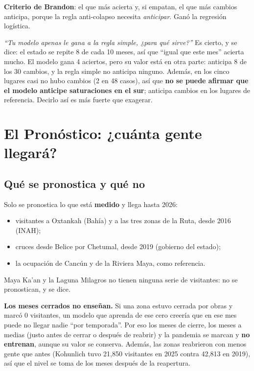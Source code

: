 \textbf{Criterio de Brandon}: el que más acierta y, si empatan, el que más cambios anticipa, porque la regla anti-colapso
necesita \emph{anticipar}. Ganó la regresión logística.

\begin{teprofe}
\emph{``Tu modelo apenas le gana a la regla simple, ¿para qué sirve?''} Es cierto, y se dice: el estado se repite 8 de cada
10 meses, así que ``igual que este mes'' acierta mucho. El modelo gana 4 aciertos, pero su valor está en otra parte:
anticipa 8 de los 30 cambios, y la regla simple no anticipa ninguno. Además, en los cinco lugares casi no hubo cambios
(2 en 48 casos), así que \textbf{no se puede afirmar que el modelo anticipe saturaciones en el sur}; anticipa cambios en los
lugares de referencia. Decirlo así es más fuerte que exagerar.
\end{teprofe}

\section{El Pronóstico: ¿cuánta gente llegará?}
\subsection{Qué se pronostica y qué no}
Solo se pronostica lo que está \textbf{medido} y llega hasta 2026:
\begin{itemize}
\item visitantes a Oxtankah (Bahía) y a las tres zonas de la Ruta, desde 2016 (INAH);
\item cruces desde Belice por Chetumal, desde 2019 (gobierno del estado);
\item la ocupación de Cancún y de la Riviera Maya, como referencia.
\end{itemize}
Maya Ka'an y la Laguna Milagros no tienen ninguna serie de visitantes: no se pronostican, y se dice.

\begin{porque}
\textbf{Los meses cerrados no enseñan.} Si una zona estuvo cerrada por obras y marcó 0 visitantes, un modelo que aprenda de
ese cero creería que en ese mes puede no llegar nadie ``por temporada''. Por eso los meses de cierre, los meses a medias
(justo antes de cerrar o después de reabrir) y la pandemia se marcan y \textbf{no entrenan}, aunque su valor se conserva.
Además, las zonas reabrieron con menos gente que antes (Kohunlich tuvo 21,850 visitantes en 2025 contra 42,813 en 2019),
así que el nivel se toma de los meses después de la reapertura.
\end{porque}

